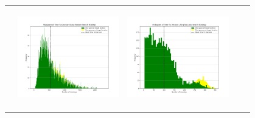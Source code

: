 \begin{landscape}
\begin{table}[h!]
\begin{tabular}{ | c | c | c | c | c |}
\begin{minipage}[c][45mm][c]{45mm}
    \end{minipage}
    &
    \begin{minipage}[c][45mm][c]{45mm}
      \includegraphics[width=44mm, height=44mm]{Chapters/MultiAgentTargetDetection/Figs/Histograms/VaryingInitBelief/75/75RandomHistogram.png}
    \end{minipage}
    &
    \begin{minipage}[c][45mm][c]{45mm}
      \includegraphics[width=44mm, height=44mm]{Chapters/MultiAgentTargetDetection/Figs/Histograms/VaryingInitBelief/75/75SaccadicHistogram.png}
    \end{minipage}
    \\


\end{tabular}
\end{table}
\end{landscape}
